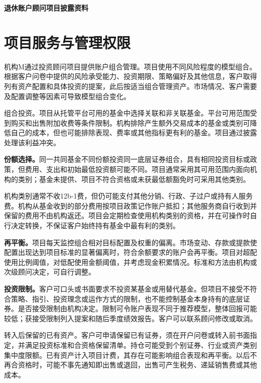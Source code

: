 \documentclass[UTF8,fontset=none,11pt,a4paper]{ctexart}
\begin{document}
{\noindent\fontsize{20}{25}\selectfont\bfseries 退休账户顾问项目披露资料\par}
\vspace{10pt}
\section*{项目服务与管理权限}
机构M通过投资顾问项目提供账户组合管理。项目使用不同风险程度的模型组合。根据客户问卷中提供的风险承受能力、投资期限、策略偏好及其他信息，客户取得列有资产配置和具体投资的提案，此后按适当组合管理资产。市场情况、客户需要及配置调整等因素可导致模型组合变化。


组合投资。项目从托管平台可用的基金中选择关联和非关联基金。平台可用范围受到购买和出售附加收费等条件限制。机构排除产生额外交易成本的基金或类别可降低自己的成本，但也可能排除表现、费率或其他指标更有利的基金。项目通过披露处理该利益冲突。


\textbf{份额选择。}同一共同基金不同份额投资同一底层证券组合，具有相同投资目标或政策，但费用、支出和初始最低投资额可能不同。项目通常采用其可用范围内面向机构的类别；基金未提供、项目不符合资格或未获最低额豁免时可采用其他类别。


机构类别通常不收12b-1费，但仍可能支付其他分销、行政、子过户或持有人服务费。机构从基金收到的部分费用按项目政策记作账户抵扣；其他服务商自行收到并保留的费用不由机构返还。项目会定期检查使用机构类别的资格，并在可操作时自行决定转换，不保证客户始终持有基金中最有利的类别。


\textbf{再平衡。}项目每天监控组合相对目标配置及权重的偏离。市场变动、存款或提款使配置出现达到项目标准的显著偏离时，符合余额要求的账户会再平衡。项目对超配使用比例阈值，对低配使用金额阈值，并考虑现金积累情况。标准和方法由机构或次级顾问决定，可自行调整。


\textbf{投资限制。}客户可口头或书面要求不投资某基金或用替代基金。但项目不接受不符合策略、指引、投资理念或运作方式的限制，也不能控制基金本身持有的底层证券。是否接受限制由机构决定。限制可令账户表现不同于推荐模型，整体回报可能较低；获接受限制列入提案和随后季度绩效报告。客户可以联系顾问修改或取消。


转入后保留的已有资产。客户可申请保留已有证券，须在开户问卷或转入前书面指定，并满足投资标准和合资格保留清单。持仓可能受到个别证券、行业或资产类别集中度限额。已有资产计入项目计费，其存在可能影响组合表现和再平衡。以后不再合资格时，可能不事先通知即出售或退回，出售可产生税务、递延销售费或其他成本。
\end{document}
